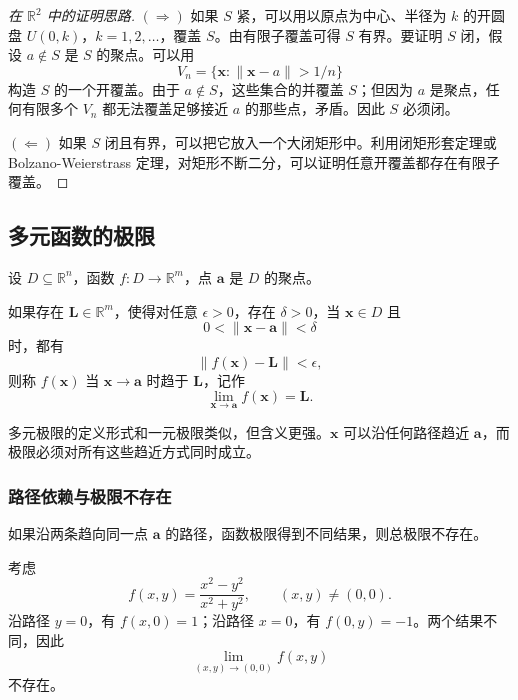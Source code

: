 \begin{proof}[在 $\mathbb{R}^2$ 中的证明思路]
$(\Rightarrow)$ 如果 $S$ 紧，可以用以原点为中心、半径为 $k$ 的开圆盘 $U(0,k)$，$k=1,2,\dots$，覆盖 $S$。由有限子覆盖可得 $S$ 有界。要证明 $S$ 闭，假设 $a\notin S$ 是 $S$ 的聚点。可以用
\[
    V_n=\{\mathbf{x}:\|\mathbf{x}-a\|>1/n\}
\]
构造 $S$ 的一个开覆盖。由于 $a\notin S$，这些集合的并覆盖 $S$；但因为 $a$ 是聚点，任何有限多个 $V_n$ 都无法覆盖足够接近 $a$ 的那些点，矛盾。因此 $S$ 必须闭。

$(\Leftarrow)$ 如果 $S$ 闭且有界，可以把它放入一个大闭矩形中。利用闭矩形套定理或 Bolzano-Weierstrass 定理，对矩形不断二分，可以证明任意开覆盖都存在有限子覆盖。
\end{proof}

\subsection{多元函数的极限}

设 $D\subseteq\mathbb{R}^n$，函数 $f:D\to\mathbb{R}^m$，点 $\mathbf{a}$ 是 $D$ 的聚点。

\begin{definition}[多元函数极限]
如果存在 $\mathbf{L}\in\mathbb{R}^m$，使得对任意 $\epsilon>0$，存在 $\delta>0$，当 $\mathbf{x}\in D$ 且
\[
    0<\|\mathbf{x}-\mathbf{a}\|<\delta
\]
时，都有
\[
    \|f(\mathbf{x})-\mathbf{L}\|<\epsilon,
\]
则称 $f(\mathbf{x})$ 当 $\mathbf{x}\to\mathbf{a}$ 时趋于 $\mathbf{L}$，记作
\[
    \lim_{\mathbf{x}\to\mathbf{a}}f(\mathbf{x})=\mathbf{L}.
\]
\end{definition}

多元极限的定义形式和一元极限类似，但含义更强。$\mathbf{x}$ 可以沿任何路径趋近 $\mathbf{a}$，而极限必须对所有这些趋近方式同时成立。

\subsubsection{路径依赖与极限不存在}

\begin{theorem}[路径判别]
如果沿两条趋向同一点 $\mathbf{a}$ 的路径，函数极限得到不同结果，则总极限不存在。
\end{theorem}

\begin{example}
考虑
\[
    f(x,y)=\frac{x^2-y^2}{x^2+y^2},\qquad (x,y)\neq(0,0).
\]
沿路径 $y=0$，有 $f(x,0)=1$；沿路径 $x=0$，有 $f(0,y)=-1$。两个结果不同，因此
\[
    \lim_{(x,y)\to(0,0)}f(x,y)
\]
不存在。
\end{example}

